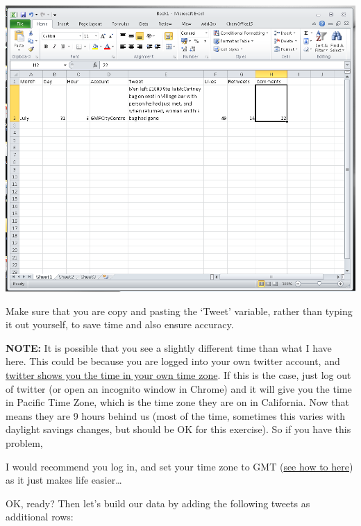\documentclass[]{book}
\theoremstyle{definition}
\theoremstyle{definition}
\theoremstyle{definition}
\theoremstyle{remark}
\begin{document}
\includegraphics{imgs/tweet1_entered.png}

Make sure that you are copy and pasting the `Tweet' variable, rather
than typing it out yourself, to save time and also ensure accuracy.

\textbf{NOTE:} It is possible that you see a slightly different time
than what I have here. This could be because you are logged into your
own twitter account, and
\href{http://www.adweek.com/digital/tweet-timestamps/}{twitter shows you
the time in your own time zone}. If this is the case, just log out of
twitter (or open an incognito window in Chrome) and it will give you the
time in Pacific Time Zone, which is the time zone they are on in
California. Now that means they are 9 hours behind us (most of the time,
sometimes this varies with daylight savings changes, but should be OK
for this exercise). So if you have this problem,

I would recommend you log in, and set your time zone to GMT
(\href{https://support.twitter.com/articles/20169405}{see how to here})
as it just makes life easier\ldots{}

OK, ready? Then let's build our data by adding the following tweets as
additional rows:
\end{document}
